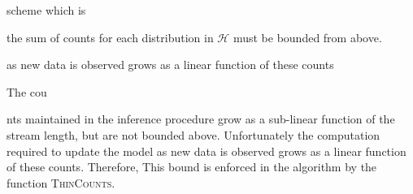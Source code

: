 scheme which is 


the sum of counts for each distribution in $\mathcal{H}$ must be bounded from above.

as new data is observed grows as a linear function of these counts

The cou


nts maintained in the inference procedure grow as a sub-linear function of the stream length, but are not bounded above.  Unfortunately the computation required to update the model as new data is observed grows as a linear function of these counts.  Therefore,   This bound is enforced in the algorithm by the function \textsc{ThinCounts}.